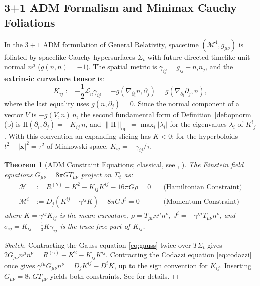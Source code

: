\documentclass[11pt,reqno]{amsart}
\newtheorem{theorem}{Theorem}[section]
\theoremstyle{definition}
\providecommand{\II}{\mathrm{I\!I}}
\newcommand{\op}{\mathrm{op}}
\numberwithin{equation}{section}
\providecommand{\II}{\mathrm{II}}
\begin{document}
\subsection{3+1 ADM Formalism and Minimax Cauchy Foliations}
In the $3+1$ ADM formulation of General Relativity, spacetime $(\mathcal{M}^4, g_{\mu\nu})$ is foliated by spacelike Cauchy hypersurfaces $\Sigma_t$ with future-directed timelike unit normal $n^\mu$ ($g(n, n) = -1$).
The spatial metric is $\gamma_{ij} = g_{ij} + n_i n_j$, and the \textbf{extrinsic curvature tensor} is:
\begin{equation}
\label{eq:Kij}
K_{ij} := -\frac{1}{2} \mathcal{L}_n \gamma_{ij} = -g(\bar{\nabla}_{\partial_i} n, \partial_j) = g(\bar{\nabla}_{\partial_i} \partial_j, n),
\end{equation}
where the last equality uses $g(n, \partial_j) = 0$. Since the normal component of a vector $V$ is $-g(V,n)\,n$, the second fundamental form of Definition~\ref{def:opnorm}(b) is $\II(\partial_i, \partial_j) = -K_{ij}\, n$, and $\|\II\|_{\op} = \max_i |\lambda_i|$ for the eigenvalues $\lambda_i$ of $K^i{}_j$. With this convention an expanding slicing has $K < 0$: for the hyperboloids $t^2 - |\mathbf{x}|^2 = \tau^2$ of Minkowski space, $K_{ij} = -\gamma_{ij}/\tau$.

\begin{theorem}[ADM Constraint Equations; classical, see \cite{adm1962}, {\cite[Ch.~3]{gourgoulhon2012}}]
\label{thm:adm_constraints}
The Einstein field equations $G_{\mu\nu} = 8\pi G T_{\mu\nu}$ project on $\Sigma_t$ as:
\begin{align}
\label{eq:hamiltonian_constraint}
\mathcal{H} &:= R^{(\gamma)} + K^2 - K_{ij}K^{ij} - 16\pi G \rho = 0 \quad &\text{(Hamiltonian Constraint)} \\
\label{eq:momentum_constraint}
\mathcal{M}^i &:= D_j (K^{ij} - \gamma^{ij} K) - 8\pi G J^i = 0 \quad &\text{(Momentum Constraint)}
\end{align}
where $K = \gamma^{ij} K_{ij}$ is the mean curvature, $\rho = T_{\mu\nu}n^\mu n^\nu$, $J^i = -\gamma^{i\mu} T_{\mu\nu} n^\nu$, and $\sigma_{ij} = K_{ij} - \frac{1}{3} K \gamma_{ij}$ is the trace-free part of $K_{ij}$.
\end{theorem}
\begin{proof}[Sketch]
Contracting the Gauss equation \eqref{eq:gauss} twice over $T\Sigma_t$ gives $2 G_{\mu\nu}n^\mu n^\nu = R^{(\gamma)} + K^2 - K_{ij}K^{ij}$. Contracting the Codazzi equation \eqref{eq:codazzi} once gives $\gamma^{i\mu} G_{\mu\nu} n^\nu = D_j K^{ij} - D^i K$, up to the sign convention for $K_{ij}$. Inserting $G_{\mu\nu} = 8\pi G T_{\mu\nu}$ yields both constraints. See \cite[\S 3.4]{gourgoulhon2012} for details.
\end{proof}
\end{document}
